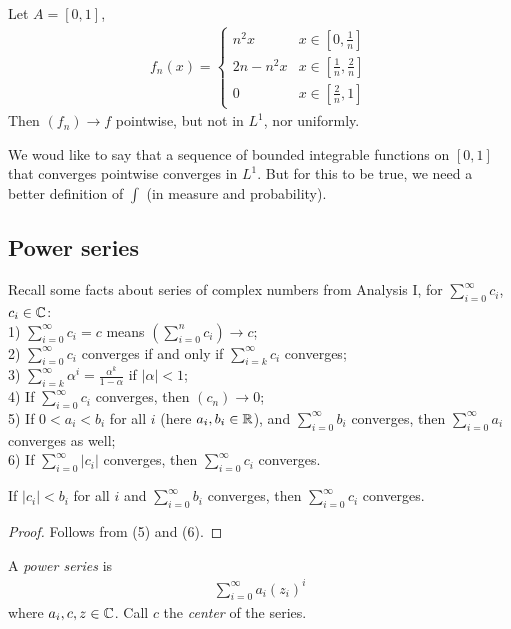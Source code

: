 \documentclass[a4paper]{article}
\begin{document}
\begin{eg}
Let $A=\left[0,1\right]$,
\begin{equation*}
\begin{aligned}
f_n\left(x\right) = \left\{
\begin{array}{ll}
n^2 x & x\in\left[0,\frac{1}{n}\right]\\
2n-n^2 x & x\in\left[\frac{1}{n},\frac{2}{n}\right]\\
0 & x\in\left[\frac{2}{n},1\right]
\end{array}
\right.
\end{aligned}
\end{equation*}
Then $\left(f_n\right) \to f$ pointwise, but not in $L^1$, nor uniformly.
\end{eg}

We woud like to say that a sequence of bounded integrable functions on $\left[0,1\right]$ that converges pointwise converges in $L^1$. But for this to be true, we need a better definition of $\int$ (in measure and probability).

\subsection{Power series}
Recall some facts about series of complex numbers from Analysis I, for $\sum_{i=0}^\infty c_i$, $c_i \in \mathbb{C}$:\\
1) $\sum_{i=0}^\infty c_i = c$ means $\left(\sum_{i=0}^n c_i\right) \to c$;\\
2) $\sum_{i=0}^\infty c_i$ converges if and only if $\sum_{i=k}^\infty c_i$ converges;\\
3) $\sum_{i=k}^\infty \alpha^i = \frac{\alpha^k}{1-\alpha}$ if $|\alpha|<1$;\\
4) If $\sum_{i=0}^\infty c_i$ converges, then $\left(c_n\right) \to 0$;\\
5) If $0<a_i<b_i$ for all $i$ (here $a_i,b_i\in\mathbb{R}$), and $\sum_{i=0}^\infty b_i$ converges, then $\sum_{i=0}^\infty a_i$ converges as well;\\
6) If $\sum_{i=0}^\infty |c_i|$ converges, then $\sum_{i=0}^\infty c_i$ converges.

\begin{coro}
If $|c_i| < b_i$ for all $i$ and $\sum_{i=0}^\infty b_i$ converges, then $\sum_{i=0}^\infty c_i$ converges.
\begin{proof}
Follows from (5) and (6).
\end{proof}
\end{coro}

\begin{defi}
A \emph{power series} is 
\begin{equation*}
\begin{aligned}
\sum_{i=0}^\infty a_i \left(z_i\right)^i
\end{aligned}
\end{equation*}
where $a_i,c,z\in \mathbb{C}$. Call $c$ the \emph{center} of the series.
\end{defi}
\end{document}
